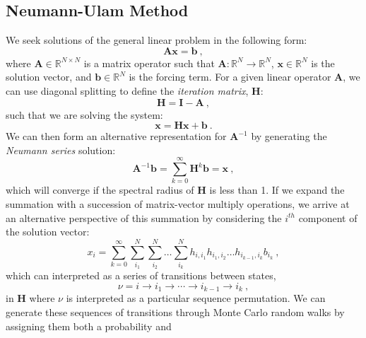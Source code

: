 \documentclass{snamc2013}
\begin{document}
\subsection{Neumann-Ulam Method}
We seek solutions of the general linear problem in the following form:
\begin{equation}
  \mathbf{A} \mathbf{x} = \mathbf{b}\:,
  \label{eq:linear_problem}
\end{equation}
where $\mathbf{A} \in \mathbb{R}^{N \times N}$ is a matrix operator
such that $\mathbf{A} : \mathbb{R}^{N} \rightarrow \mathbb{R}^{N}$,
$\mathbf{x} \in \mathbb{R}^N$ is the solution vector, and $\mathbf{b}
\in \mathbb{R}^N$ is the forcing term.  For a given linear operator
$\mathbf{A}$, we can use diagonal splitting to define the
\textit{iteration matrix}, $\mathbf{H}$:
\begin{equation}
  \mathbf{H} = \mathbf{I} - \mathbf{A}\:,
  \label{eq:linear_mc_iteration_matrix}
\end{equation}
such that we are solving the system:
\begin{equation}
  \mathbf{x} = \mathbf{H} \mathbf{x} + \mathbf{b}\:.
  \label{eq:richardson_split}
\end{equation}
We can then form an alternative representation for $\mathbf{A}^{-1}$
by generating the \textit{Neumann series} solution:
\begin{equation}
  \mathbf{A}^{-1}\mathbf{b} = \sum_{k=0}^{\infty}
  \mathbf{H}^k\mathbf{b} = \mathbf{x}\:,
  \label{eq:neumann_solution}
\end{equation}
which will converge if the spectral radius of $\mathbf{H}$ is less
than 1. If we expand the summation with a succession of matrix-vector
multiply operations, we arrive at an alternative perspective of this
summation by considering the $i^{th}$ component of the solution
vector:
\begin{equation}
  x_i = \sum_{k=0}^{\infty}\sum_{i_1}^{N}\sum_{i_2}^{N}\ldots
  \sum_{i_k}^{N}h_{i,i_1}h_{i_1,i_2}\ldots h_{i_{k-1},i_k}b_{i_k}\:,
  \label{eq:expanded_neumann_solution}
\end{equation}
which can interpreted as a series of transitions between states,
\begin{equation}
 \nu = i \rightarrow i_1 \rightarrow \cdots \rightarrow i_{k-1}
 \rightarrow i_{k}\:,
  \label{eq:mc_walk_permutation}
\end{equation}
in $\mathbf{H}$ where $\nu$ is interpreted as a particular sequence
permutation. We can generate these sequences of transitions through
Monte Carlo random walks by assigning them both a probability and
\end{document}
